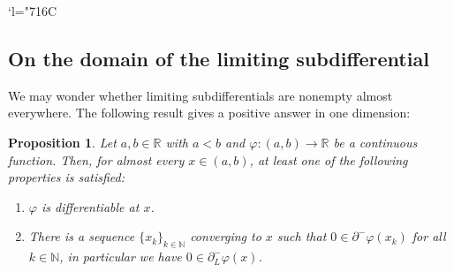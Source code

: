 \documentclass[JEP,XML,SOM,Unicode,NoFloatCountersInSection,published]{cedram}
\newenvironment{enumeratei}
{\bgroup\def\theenumi{\roman{enumi}}\def\theenumii{\arabic{enumii}}\begin{enumerate}}
{\end{enumerate}\egroup}
\newcommand{\Changelback}{\mathcode`l="716C}
\newcommand\R{\mathbb R}
\newcommand\N{\mathbb N}
\newtheorem{proposition}[theorem]{Proposition}
\theoremstyle{definition}
\begin{document}
\Changelback

\subsection{On the domain of the limiting subdifferential}\label{SECAlter}

We may wonder whether limiting subdifferentials are nonempty almost everywhere. The following result gives a positive answer in one dimension:

\begin{proposition}\label{PROPDichotomy}
Let $a,b\in \R$ with $a<b$ and $\varphi :(a,b) \to \R$ be a continuous function. Then, for almost every $x\in (a,b)$, at least one of the following properties is satisfied:
\begin{enumeratei}
\item\label{PROPDichotomyi}
$\varphi$ is differentiable at $x$.
\item\label{PROPDichotomyii}
There is a sequence $\{x_k\}_{k\in \N}$ converging to $x$ such that $0\in \partial^-\varphi(x_k)$ for all $k\in \N$, in particular we have $0\in \partial^-_L \varphi(x)$.
\end{enumeratei}
\end{proposition}
\end{document}

